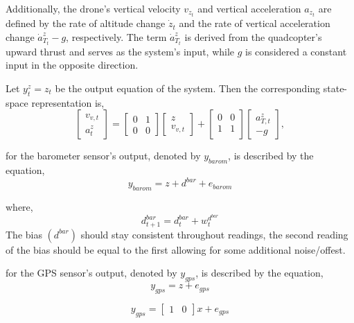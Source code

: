 \documentclass{article}
\begin{document}
Additionally, the drone's vertical velocity \( v_{z_t} \) and vertical acceleration \( a_{z_t} \) are defined by the rate of altitude change \( \dot{z}_t \) and the rate of vertical acceleration change \( \dot{a}^z_{T_t} - g \), respectively. The term \( \dot{a}^z_{T_t} \) is derived from the quadcopter's upward thrust and serves as the system's input, while \( g \) is considered a constant input in the opposite direction.

Let \( y_{t}^z = z_t \) be the output equation of the system. Then the corresponding state-space representation is,
\begin{equation}
\begin{bmatrix}
v_{v,t}\\
a_{t}^z
\end{bmatrix} =
\begin{bmatrix}
0 & 1 \\
0 & 0 
\end{bmatrix}
\begin{bmatrix}
z\\
v_{v,t}
\end{bmatrix} + 
\begin{bmatrix}
0 & 0 \\
1 & 1 \\ 
\end{bmatrix}
\begin{bmatrix}
a_{T,t}^z \\ 
-g
\end{bmatrix},\label{eq:4}
\end{equation}

\noindent
for the barometer sensor's output, denoted by \( y_{barom} \), is described by the equation,
\begin{equation}
y_{barom} = z + d^{bar} + e_{barom}
\end{equation}

where, 
\begin{equation}
    d^{bar}_{t+1} = d^{bar}_t + w_{t}^{d^{bar}}
\end{equation}
The bias $(d^{bar})$ should stay consistent throughout readings, 
the second reading of the bias should be equal to the first allowing for some additional noise/offest.

\noindent
for the GPS sensor's output, denoted by \( y_{gps} \), is described by the equation,
\begin{equation}
y_{gps} = z + e_{gps}
\end{equation}

\begin{equation}
y_{gps} =
\begin{bmatrix}
    1 & 0
\end{bmatrix}
x + e_{gps}
\end{equation}
\end{document}
